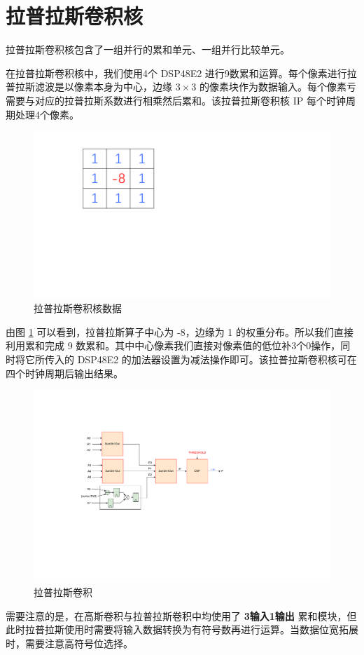 \documentclass[12pt, a4paper, oneside]{ctexbook}
\begin{document}
	\section{拉普拉斯卷积核}
	拉普拉斯卷积核包含了一组并行的累和单元、一组并行比较单元。\par
	在拉普拉斯卷积核中，我们使用4个 DSP48E2 进行9数累和运算。每个像素进行拉普拉斯滤波是以像素本身为中心，边缘 $3\times3$ 的像素块作为数据输入。每个像素亏需要与对应的拉普拉斯系数进行相乘然后累和。该拉普拉斯卷积核 IP 每个时钟周期处理4个像素。\par
	\begin{figure}[h]
		\centering
		\includegraphics[scale=0.4]{pic/number_3}
		\caption{拉普拉斯卷积核数据}
		\label{fig:number3}
	\end{figure}
	由图 \ref{fig:number3} 可以看到，拉普拉斯算子中心为 -8，边缘为 1 的权重分布。所以我们直接利用累和完成 9 数累和。其中中心像素我们直接对像素值的低位补3个0操作，同时将它所传入的 DSP48E2 的加法器设置为减法操作即可。该拉普拉斯卷积核可在四个时钟周期后输出结果。\par
	\begin{figure}[h]	
	\centering
	\includegraphics[scale=0.7]{pic/laplace.pdf}
	\caption{拉普拉斯卷积}
	\label{laplace}
	\end{figure}	
	需要注意的是，在高斯卷积与拉普拉斯卷积中均使用了 \textbf{3输入1输出} 累和模块，但此时拉普拉斯使用时需要将输入数据转换为有符号数再进行运算。当数据位宽拓展时，需要注意高符号位选择。
	
\end{document}
